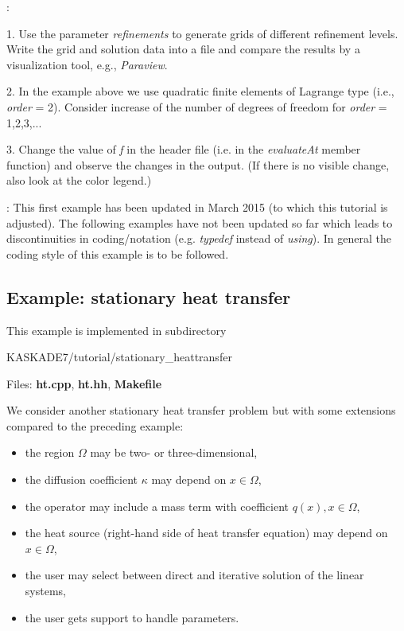 \documentclass[11pt]{article}
\begin{document}
:

1. Use the parameter {\em refinements} to generate grids of different refinement levels. Write the
grid and solution data into a file and compare the results by a visualization tool, e.g., {\em Paraview}.

2. In the example above we use quadratic finite elements of Lagrange type (i.e., {\em order} = 2).
Consider increase of the number of degrees of freedom for  {\em order} = 1,2,3,...

3. Change the value of \emph{f} in the header file (i.e. in the \emph{evaluateAt} member function) and
observe the changes in the output. (If there is no visible change, also look at the color legend.)

\vspace{1em}
: This first example has been updated in March 2015 (to which this tutorial is adjusted).
The following examples have not been updated so far which leads to discontinuities in coding/notation (e.g.
\emph{typedef} instead of \emph{using}).
In general the coding style of this example is to be followed.

\subsection{Example: stationary heat transfer}\label{StatHeat}

This example is implemented in subdirectory 
\begin{center} KASKADE7/tutorial/stationary\_heattransfer\end{center}

\noindent Files: {\bf ht.cpp}, {\bf ht.hh}, {\bf Makefile}

\noindent We consider another stationary heat transfer problem but with some
extensions compared to the preceding example:

\begin{itemize}
\item the region $\Omega$ may be two- or three-dimensional,
\item the diffusion coefficient $\kappa$ may depend on $x \in \Omega$,
\item the operator may include a mass term with coefficient $q(x), x \in \Omega$,
\item the heat source (right-hand side of heat transfer equation) may depend on $x \in \Omega$,
\item the user may select between direct and iterative solution of the linear systems,
\item the user gets support to handle parameters.
\end{itemize}
\end{document}
